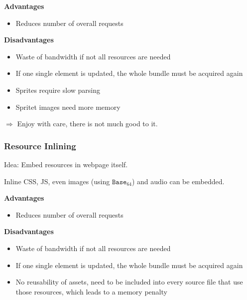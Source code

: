 \documentclass[english]{panikzettel}
\begin{document}
	\begin{halfboxl}
		\textbf{Advantages} 
		\begin{itemize}
			\item Reduces number of overall requests
		\end{itemize}
	\end{halfboxl}%
	\begin{halfboxr}
		\vspace{-\baselineskip}
		\textbf{Disadvantages}
		\begin{itemize}
			\item Waste of bandwidth if not all resources are needed
			\item If one single element is updated, the whole bundle must be acquired again
			\item Sprites require slow parsing
			\item Spritet images need more memory
		\end{itemize}
	\end{halfboxr}

	\( \Rightarrow \) Enjoy with care, there is not much good to it.

	\subsubsection{Resource Inlining}
	\label{sss-resource-inlining}
	
	Idea: Embed resources in webpage itself.

	Inline CSS, JS, even images (using \( \texttt{Base}_{64} \)) and audio can be embedded.

	\begin{halfboxl}
		\textbf{Advantages} 
		\begin{itemize}
			\item Reduces number of overall requests
		\end{itemize}
	\end{halfboxl}%
	\begin{halfboxr}
		\vspace{-\baselineskip}
		\textbf{Disadvantages}
		\begin{itemize}
			\item Waste of bandwidth if not all resources are needed
			\item If one single element is updated, the whole bundle must be acquired again
			\item No reusability of assets, need to be included into every source file that use those resources, which leads to a memory penalty
		\end{itemize}
	\end{halfboxr}
\end{document}
